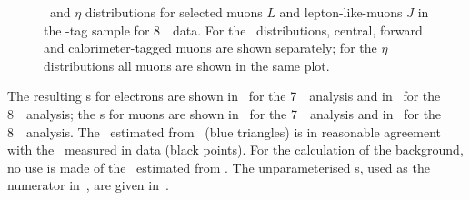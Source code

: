 \begin{figure}[h!]
{        }
    \caption[\pt\ and $\eta$ distributions for selected muons $L$ and
    muon-like-jets $J$ in the \Z-tag sample for 8~\tev\ data.]
    {\small \pt\ and $\eta$ distributions for selected muons $L$ and
    lepton-like-muons $J$ in the \Z-tag sample for 8~\tev\ data. 
    For the \pt\ distributions, central, forward and calorimeter-tagged muons are shown
    separately; for the $\eta$ distributions all muons are
    shown in the same plot.}
\label{fig:ljdist-mu-eight} 
\end{figure}


The resulting \fakefactor s for electrons are shown in~ for the
7~\tev\ analysis and in~ for the 8~\tev\ analysis; the \fakefactor s
for muons are shown in~ for the
7~\tev\ analysis and in~ for the 8~\tev\ analysis. The
\ffactor\ estimated from \mcsim\ (blue triangles) is in reasonable agreement with
the \ffactor\ measured in data (black points). For the calculation of the
background, no use is made of the \ffactor\ estimated from \mcsim. The unparameterised \FF
s, used as the numerator in~, are given in~.

